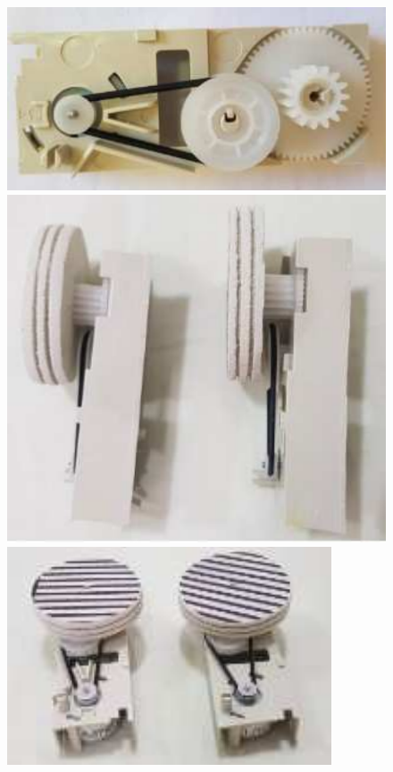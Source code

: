 \documentclass{textolivre-html}
\begin{document}
\begin{enumerate}
\begin{enumerate}
    \begin{figure}[H]
    \begin{minipage}{0.31\textwidth}
    \includegraphics[width=\linewidth]{figure-05.pdf}
    \subcaption{}
    \end{minipage}
    \hfill
    \begin{minipage}{0.31\textwidth} 
    \includegraphics[width=\linewidth]{figure-06.pdf}
    \subcaption{}
    \end{minipage}
    \hfill
    \begin{minipage}{0.31\textwidth} 
    \includegraphics[width=\linewidth]{figure-07.pdf}

\end{minipage}
\end{figure}
\end{enumerate}
\end{enumerate}
\end{document}
